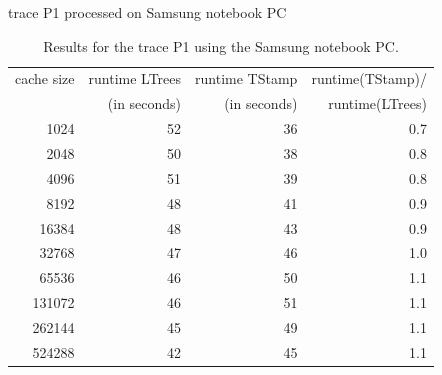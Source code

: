 \documentclass[a4paper,12pt, titlepage]{article}  %
\begin{document}
\begin{table}[p]
\begin{center}
	trace P1 processed on Samsung notebook PC
	\begin{tabular}{|r||r|r|r|}
	  	\hline
                cache size                               &     runtime LTrees         &      runtime TStamp          &  runtime(TStamp)/ \\
                                                             &      (in seconds)            &      (in seconds)                 & runtime(LTrees)     \\
                \hline
                1024			             &             52                 &               36                     &            0.7            \\
		2048					     &     50                         &       38                             &    0.8                    \\								
		4096					     &     51                         &       39                             &    0.8                    \\	
		8192					     &     48                         &       41                             &    0.9                    \\	
		16384				     &     48                         &       43                             &    0.9                    \\	
		32768				     &     47                         &       46                             &    1.0                    \\	
		65536				     &     46                         &       50                             &    1.1                    \\	
		131072				     &     46                         &       51                             &    1.1                    \\	
		262144				     &     45                         &       49                             &    1.1                    \\	
		524288				     &     42                         &       45                             &    1.1                    \\
                \hline
	\end{tabular}
	\caption{Results for the trace P1 using the Samsung notebook PC.}
        \label{tab:samsung_P1}
\end{center}
\end{table}
\end{document}
